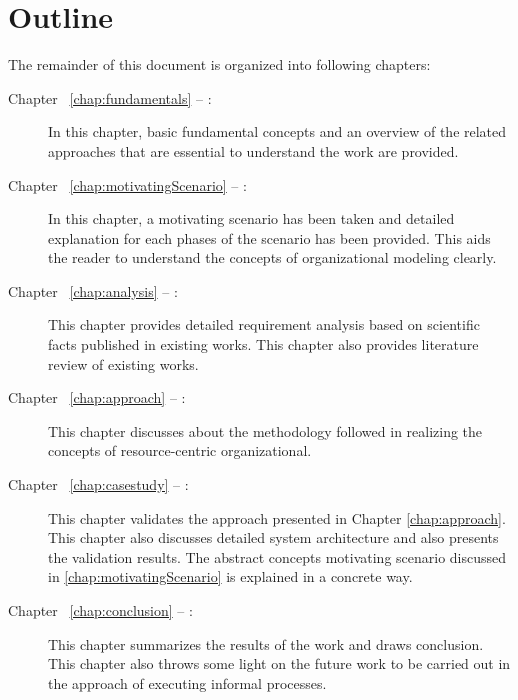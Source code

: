 \section {Outline}
\label{sec:outline}
The remainder of this document is organized into following chapters:
\begin{description}
	\item[Chapter ~\ref{chap:fundamentals} -- :] In this chapter, basic fundamental concepts and an overview of the related approaches that are essential to understand the work are provided.
	\item[Chapter ~\ref{chap:motivatingScenario} -- :] In this chapter, a motivating scenario has been taken and detailed explanation for each phases of the scenario has been provided. This aids the reader to understand the concepts of organizational modeling clearly. 
	\item[Chapter ~\ref{chap:analysis} -- :] This chapter provides detailed requirement analysis based on scientific facts published in existing works. This chapter also provides literature review of existing works.
	\item[Chapter ~\ref{chap:approach} -- :] This chapter discusses about the methodology followed in realizing the concepts  of resource-centric organizational.
	\item[Chapter ~\ref{chap:casestudy} -- :] This chapter validates the approach presented in Chapter \ref{chap:approach}. This chapter also discusses detailed system architecture and also presents the validation results. The abstract concepts motivating scenario discussed in \ref{chap:motivatingScenario} is explained in a concrete way.	
	\item[Chapter ~\ref{chap:conclusion} -- :] This chapter summarizes the results of the work and draws conclusion. This chapter also throws some light on the future work to be carried out in the approach of executing informal processes. 
\end{description}